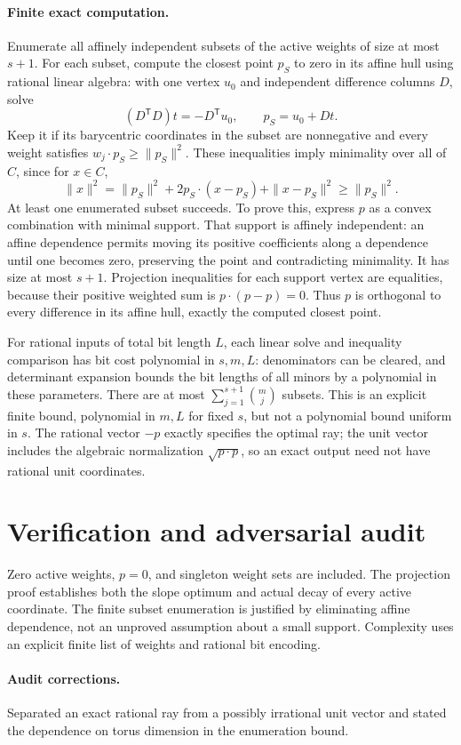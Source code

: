 \documentclass[11pt]{article}
\begin{document}
\paragraph{Finite exact computation.}
Enumerate all affinely independent subsets of the active weights of size at most $s+1$. For each subset, compute the closest point $p_S$ to zero in its affine hull using rational linear algebra: with one vertex $u_0$ and independent difference columns $D$, solve
\[
(D^{\mathsf T}D)t=-D^{\mathsf T}u_0,\qquad p_S=u_0+Dt.
\]
Keep it if its barycentric coordinates in the subset are nonnegative and every weight satisfies $w_j\cdot p_S\geq\|p_S\|^2$. These inequalities imply minimality over all of $C$, since for $x\in C$,
\[
\|x\|^2=\|p_S\|^2+2p_S\cdot(x-p_S)+\|x-p_S\|^2\geq\|p_S\|^2.
\]
At least one enumerated subset succeeds. To prove this, express $p$ as a convex combination with minimal support. That support is affinely independent: an affine dependence permits moving its positive coefficients along a dependence until one becomes zero, preserving the point and contradicting minimality. It has size at most $s+1$. Projection inequalities for each support vertex are equalities, because their positive weighted sum is $p\cdot(p-p)=0$. Thus $p$ is orthogonal to every difference in its affine hull, exactly the computed closest point.

For rational inputs of total bit length $L$, each linear solve and inequality comparison has bit cost polynomial in $s,m,L$: denominators can be cleared, and determinant expansion bounds the bit lengths of all minors by a polynomial in these parameters. There are at most $\sum_{j=1}^{s+1}\binom mj$ subsets. This is an explicit finite bound, polynomial in $m,L$ for fixed $s$, but not a polynomial bound uniform in $s$. The rational vector $-p$ exactly specifies the optimal ray; the unit vector includes the algebraic normalization $\sqrt{p\cdot p}$, so an exact output need not have rational unit coordinates.
\section{Verification and adversarial audit}
Zero active weights, $p=0$, and singleton weight sets are included. The projection proof establishes both the slope optimum and actual decay of every active coordinate. The finite subset enumeration is justified by eliminating affine dependence, not an unproved assumption about a small support. Complexity uses an explicit finite list of weights and rational bit encoding.
\paragraph{Audit corrections.} Separated an exact rational ray from a possibly irrational unit vector and stated the dependence on torus dimension in the enumeration bound.
\end{document}
